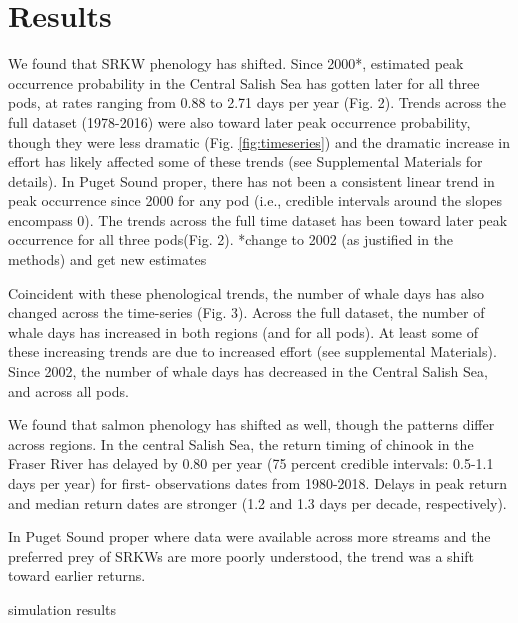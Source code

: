 \documentclass{article}
\begin{document}
\section*{Results}
\par We found that SRKW phenology has shifted. Since 2000*, estimated peak occurrence probability in the Central Salish Sea has gotten later for all three pods, at rates ranging from 0.88  to 2.71 days per year (Fig. 2). Trends across the full dataset (1978-2016) were also toward later peak occurrence probability, though they were less dramatic (Fig. \ref{fig:timeseries}) and the dramatic increase in effort has likely affected some of these trends (see Supplemental Materials for details).  In Puget Sound proper, there has not been a consistent linear trend in peak occurrence since 2000 for any pod (i.e., credible intervals around the slopes encompass 0). The trends across the full time dataset has been toward later peak occurrence for all three pods(Fig. 2). 
*change to 2002 (as justified in the methods) and get new estimates
\par Coincident with these phenological trends, the number of whale days has also changed across the time-series (Fig. 3). Across the full dataset, the number of whale days has increased in both regions (and for all pods). At least some of these increasing trends are due to increased effort (see supplemental Materials). Since 2002, the number of whale days has decreased in the Central Salish Sea, and across all pods. 
\par We found that salmon phenology has shifted as well, though the patterns differ across regions. In the central Salish Sea, the return timing of chinook in the Fraser River has delayed by 0.80 per year (75 percent credible intervals: 0.5-1.1 days per year) for first- observations dates from 1980-2018.  Delays in peak return and median return dates are stronger (1.2 and 1.3 days per decade, respectively).
\par In Puget Sound proper where data were available across more streams and the preferred prey of SRKWs are more poorly understood, the trend was a shift toward earlier returns.
\par simulation results
\end{document}
